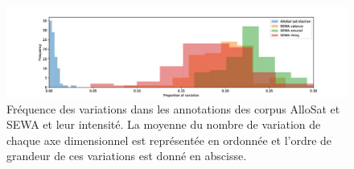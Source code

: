\begin{figure}[thb]
  \centering
    \includegraphics[width=18cm]{./Chapitre5/figures/variation.jpeg}
    \caption{Fréquence des variations dans les annotations des corpus AlloSat et SEWA et leur intensité. La moyenne du nombre de variation de chaque axe dimensionnel est représentée en ordonnée et l'ordre de grandeur de ces variations est donné en abscisse.}
    \label{fig:variationAnnot}
\end{figure}

